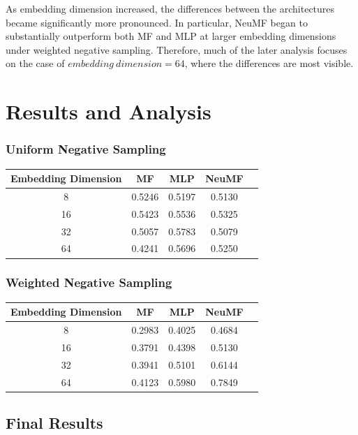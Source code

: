 \documentclass{article}
\begin{document}
As embedding dimension increased, the differences between the architectures became significantly more pronounced. In particular, NeuMF began to substantially outperform both MF and MLP at larger embedding dimensions under weighted negative sampling. Therefore, much of the later analysis focuses on the case of $embedding\ dimension = 64$, where the differences are most visible.



\section{Results and Analysis}

\subsubsection*{Uniform Negative Sampling}

\begin{center}
\begin{tabular}{ccccc}
\toprule
Embedding Dimension & MF & MLP & NeuMF \\
\midrule
8  & 0.5246 & 0.5197 & 0.5130 \\
16 & 0.5423 & 0.5536 & 0.5325 \\
32 & 0.5057 & 0.5783 & 0.5079 \\
64 & 0.4241 & 0.5696 & 0.5250 \\
\bottomrule
\end{tabular}
\end{center}

\vspace{0.5cm}

\subsubsection*{Weighted Negative Sampling}

\begin{center}
\begin{tabular}{ccccc}
\toprule
Embedding Dimension & MF & MLP & NeuMF \\
\midrule
8  & 0.2983 & 0.4025 & 0.4684 \\
16 & 0.3791 & 0.4398 & 0.5130 \\
32 & 0.3941 & 0.5101 & 0.6144 \\
64 & 0.4123 & 0.5980 & 0.7849 \\
\bottomrule
\end{tabular}
\end{center}
\subsection{Final Results}
\end{document}
